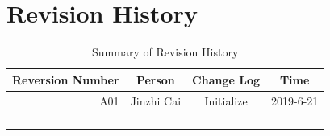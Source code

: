 \documentclass[12pt,article]{memoir}
\begin{document}
\chapter{Revision History}
\begin{table}[H]
	\centering
	\begin{tabu}{r || c | c | c }
		Reversion Number & Person & Change Log & Time\\ \hline
		A01 & Jinzhi Cai & Initialize  & 2019-6-21 \\
		 & & & \\
		 & & & \\
		 & & & \\
		 & & & \\
	\end{tabu}
	\caption{Summary of Revision History}
	\label{tab:edatools}
\end{table}

\end{document}

